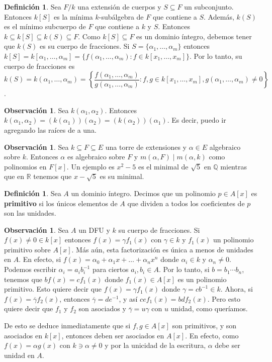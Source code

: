 \documentclass[12pt]{book}
\theoremstyle{definition}
\newtheorem{obs}[teo]{Observación}
\newtheorem{defn}[teo]{Definición}
\newcommand{\RR}{\mathbb{R}}      %
\newcommand{\QQ}{\mathbb{Q}}
\begin{document}
\begin{defn}
Sea $F/k$ una extensión de cuerpos y $S\subseteq F$ un subconjunto. Entonces $k[S]$ es la mínima $k$-subálgebra de $F$ que contiene a $S$. Además, $k(S)$ es el mínimo subcuerpo de $F$ que contiene a $k$ y $S$. Entonces $k\subseteq k[S]\subseteq k(S)\subseteq F$. Como $k[S]\subseteq F$ es un dominio íntegro, debemos tener que $k(S)$ es su cuerpo de fracciones. Si $S=\{\alpha_1,\ldots , \alpha_m\}$ entonces $k[S] = k[\alpha_1,\ldots , \alpha_m] = \{f(\alpha_1,\ldots , \alpha_m) : f\in k[x_1,\ldots , x_m]\}$. Por lo tanto, su cuerpo de fracciones es $k(S) = k(\alpha_1,\ldots , \alpha_m) = \left\{ \dfrac{f(\alpha_1,\ldots , \alpha_m)}{g(\alpha_1,\ldots ,\alpha_m)} : f,g\in k[x_1,\ldots , x_m], g(\alpha_1,\ldots , \alpha_m)\neq 0 \right\}$.
\end{defn}

\begin{obs}
Sea $k(\alpha_1,\alpha_2)$. Entonces $k(\alpha_1,\alpha_2) = (k(\alpha_1))(\alpha_2) = (k(\alpha_2))(\alpha_1)$. Es decir, puedo ir agregando las raíces de a una.
\end{obs}

\begin{obs}
Sea $k\subseteq F\subseteq E$ una torre de extensiones y $\alpha\in E$ algebraico sobre $k$. Entonces $\alpha$ es algebraico sobre $F$ y $m(\alpha,F)\mid m(\alpha,k)$ como polinomios en $F[x]$. Un ejemplo es $x^2 - 5$ es el minimal de $\sqrt{5}$ en $\QQ$ mientras que en $\RR$ tenemos que $x-\sqrt{5}$ es su minimal.
\end{obs}

\begin{defn}
Sea $A$ un dominio íntegro. Decimos que un polinomio $p\in A[x]$ es \textbf{primitivo} si los únicos elementos de $A$ que dividen a todos los coeficientes de $p$ son las unidades.
\end{defn}

\begin{obs}
Sea $A$ un DFU y $k$ su cuerpo de fracciones. Si $f(x)\neq 0\in k[x]$ entonces $f(x) = \gamma f_1(x)$ con $\gamma\in k$ y $f_1(x)$ un polinomio primitivo sobre $A[x]$. Más aún, esta factorización es única a menos de unidades en $A$. En efecto, si $f(x) = \alpha_0 + \alpha_1 x + \ldots + \alpha_n x^n$ donde $\alpha_i\in k$ y $\alpha_n\neq 0$. Podemos escribir $\alpha_i = a_i b_i^{-1}$ para ciertos $a_i,b_i\in A$. Por lo tanto, si $b = b_1\cdots b_n$, tenemos que $bf(x) = cf_1(x)$ donde $f_1(x)\in A[x]$ es un polinomio primitivo. Esto quiere decir que $f(x) = \gamma f_1(x)$ donde $\gamma = cb^{-1}\in k$. Ahora, si $f(x)=\overline{\gamma}f_2(x)$, entonces $\overline{\gamma} = de^{-1}$, y así $cef_1(x) = bdf_2(x)$. Pero esto quiere decir que $f_1$ y $f_2$ son asociados y $\overline{\gamma} = u\gamma$ con $u$ unidad, como queríamos.

De esto se deduce inmediatamente que si $f,g\in A[x]$ son primitivos, y son asociados en $k[x]$, entonces deben ser asociados en $A[x]$. En efecto, como $f(x) = \alpha g(x)$ con $k\ni\alpha\neq 0$ y por la unicidad de la escritura, $\alpha$ debe ser unidad en $A$.
\end{obs}
\end{document}
